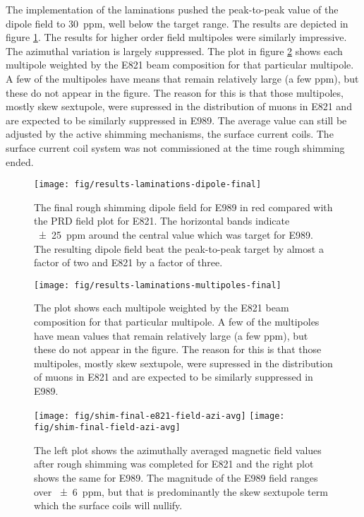 The implementation of the laminations pushed the peak-to-peak value of the dipole field to \SI{30}{ppm}, well below the target range.  The results are depicted in figure \ref{fig:results-laminations-dipole-final}.  The results for higher order field multipoles were similarly impressive.  The azimuthal variation is largely suppressed.  The plot in figure \ref{fig:results-laminations-multipoles-final} shows each multipole weighted by the E821 beam composition for that particular multipole.  A few of the multipoles have means that remain relatively large (a few ppm), but these do not appear in the figure.  The reason for this is that those multipoles, mostly skew sextupole, were supressed in the distribution of muons in E821 and are expected to be similarly suppressed in E989.  The average value can still be adjusted by the active shimming mechanisms, the surface current coils.  The surface current coil system was not commissioned at the time rough shimming ended.

\begin{figure}
\centering
\texttt{[image: fig/results-laminations-dipole-final]}
\caption{
    The final rough shimming dipole field for E989 in red compared with the PRD field plot for E821.  The horizontal bands indicate \SI{\pm 25}{ppm} around the central value which was target for E989.  The resulting dipole field beat the peak-to-peak target by almost a factor of two and E821 by a factor of three. 
    \label{fig:results-laminations-dipole-final}
}
\end{figure}

\begin{figure}
\centering
\texttt{[image: fig/results-laminations-multipoles-final]}
\caption{The plot shows each multipole weighted by the E821 beam composition for that particular multipole.  A few of the multipoles have mean values that remain relatively large (a few ppm), but these do not appear in the figure.  The reason for this is that those multipoles, mostly skew sextupole, were supressed in the distribution of muons in E821 and are expected to be similarly suppressed in E989. \label{fig:results-laminations-multipoles-final}}
\end{figure}

\begin{figure}
\centering
\texttt{[image: fig/shim-final-e821-field-azi-avg]}
\texttt{[image: fig/shim-final-field-azi-avg]}
\caption{
    The left plot shows the azimuthally averaged magnetic field values after rough shimming was completed for E821 and the right plot shows the same for E989.  The magnitude of the E989 field ranges over \SI{\pm 6}{ppm}, but that is predominantly the skew sextupole term which the surface coils will nullify.
    \label{fig/shim-field-final-azi-avg}
}
\end{figure}